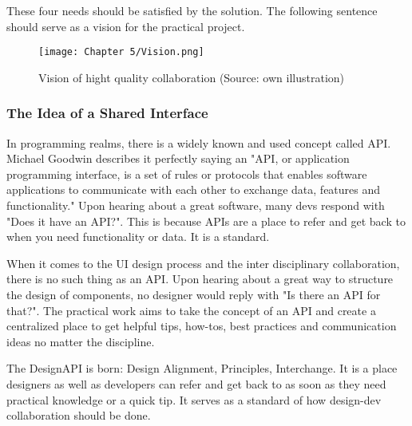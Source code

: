 These four needs should be satisfied by the solution. The following sentence should serve as a
vision for the practical project.

\begin{figure}[H]
      \centering
      \texttt{[image: Chapter 5/Vision.png]}
      \caption{Vision of hight quality collaboration (Source: own illustration)}
\end{figure}

\subsubsection{The Idea of a Shared Interface}


In programming realms, there is a widely known and used concept called API. Michael Goodwin
describes it perfectly saying an "API, or application programming interface, is a set of rules or
protocols that enables software applications to communicate with each other to exchange data,
features and functionality."  Upon hearing about a
great software, many devs respond with "Does it have an API?". This is because APIs are a place to
refer and get back to when you need functionality or data. It is a standard.

When it comes to the UI design process and the inter disciplinary collaboration, there is no such
thing as an API. Upon hearing about a great way to structure the design of components, no designer
would reply with "Is there an API for that?". The practical work aims to take the concept of an API
and create a centralized place to get helpful tips, how-tos, best practices and communication ideas
no matter the discipline.

The DesignAPI is born: Design Alignment, Principles, Interchange. It is a place designers as well as
developers can refer and get back to as soon as they need practical knowledge or a quick tip. It
serves as a standard of how design-dev collaboration should be done.

